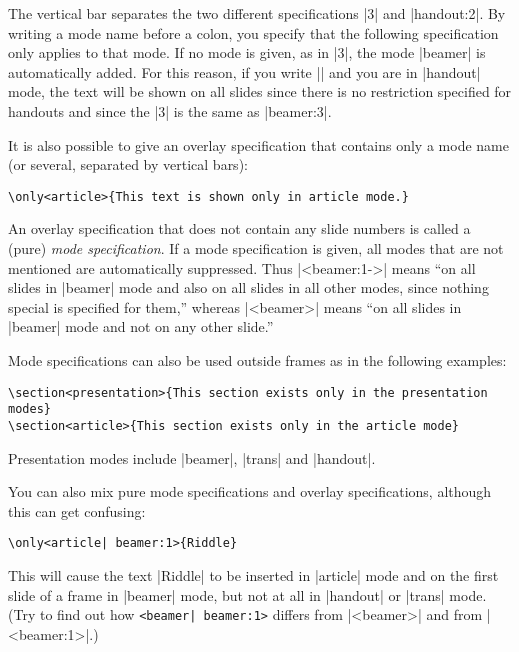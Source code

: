 \begin{original...}
The vertical bar separates the two different specifications |3| and |handout:2|. By writing a mode name before a colon, you specify that the following specification only applies to that mode. If no mode is given, as in |3|, the mode |beamer| is automatically added. For this reason, if you write || and you are in |handout| mode, the text will be shown on all slides since there is no restriction specified for handouts and since the |3| is the same as |beamer:3|.

It is also possible to give an overlay specification that contains only a mode name (or several, separated by vertical bars):
\begin{verbatim}
\only<article>{This text is shown only in article mode.}
\end{verbatim}

An overlay specification that does not contain any slide numbers is called a (pure) \emph{mode specification}. If a mode specification is given, all modes that are not mentioned are automatically suppressed. Thus |<beamer:1->| means ``on all slides in |beamer| mode and also on all slides in all other modes, since nothing special is specified for them,'' whereas |<beamer>| means ``on all slides in |beamer| mode and not on any other slide.''

Mode specifications can also be used outside frames as in the following examples:
\begin{verbatim}
\section<presentation>{This section exists only in the presentation modes}
\section<article>{This section exists only in the article mode}
\end{verbatim}

Presentation modes include |beamer|, |trans| and |handout|.

You can also mix pure mode specifications and overlay specifications, although this can get confusing:
\begin{verbatim}
\only<article| beamer:1>{Riddle}
\end{verbatim}

This will cause the text |Riddle| to be inserted in |article| mode and on the first slide of a frame in |beamer| mode, but not at all in |handout| or |trans| mode. (Try to find out how \verb/<beamer| beamer:1>/ differs from |<beamer>| and from |<beamer:1>|.)


\end{original...}
